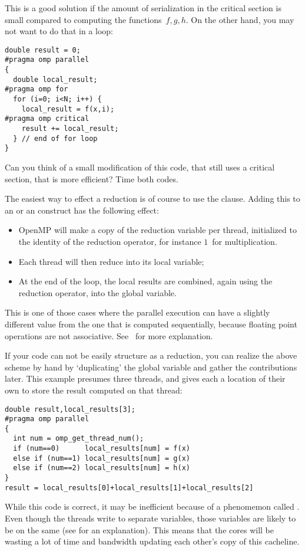 This is a good solution if the amount of serialization in the critical section
is small compared to computing the functions~$f,g,h$. On the other hand, you
may not want to do that in a loop:
\begin{verbatim}
double result = 0;
#pragma omp parallel
{
  double local_result;
#pragma omp for
  for (i=0; i<N; i++) {
    local_result = f(x,i);
#pragma omp critical
    result += local_result;
  } // end of for loop
}
\end{verbatim}
\begin{exercise}
  Can you think of a small modification of this code, that still uses a critical section,
  that is more efficient? Time both codes.
\end{exercise}

The easiest way to effect a reduction is of course to use the 
clause. Adding this to an  or an  construct
has the following effect:
\begin{itemize}
\item OpenMP will make a copy of the reduction variable per thread,
  initialized to the identity of the reduction operator, for instance
  $1$~for multiplication.
\item Each thread will then reduce into its local variable;
\item At the end of the loop, the local results are combined, again
  using the reduction operator, into the global variable.
\end{itemize}
This is one of those cases where the parallel execution can have a slightly different
value from the one that is computed sequentially, because floating point operations
are not associative. See~ for more explanation.

If your code can not be easily structure as a reduction, you can 
realize the above scheme by hand by
`duplicating' the global variable and gather the contributions later.
This example presumes three threads, and gives each a location of their
own to store the result computed on that thread:
\begin{verbatim}
double result,local_results[3];
#pragma omp parallel
{
  int num = omp_get_thread_num();
  if (num==0)      local_results[num] = f(x)
  else if (num==1) local_results[num] = g(x)
  else if (num==2) local_results[num] = h(x)
}
result = local_results[0]+local_results[1]+local_results[2]
\end{verbatim}
While this code is correct, it may be inefficient because of a
phenomemon called . Even though the threads write
to separate variables, those variables are likely to be on the same 
 (see  for an explanation).
This means that the cores will be wasting a lot of time and bandwidth updating
each other's copy of this cacheline.

